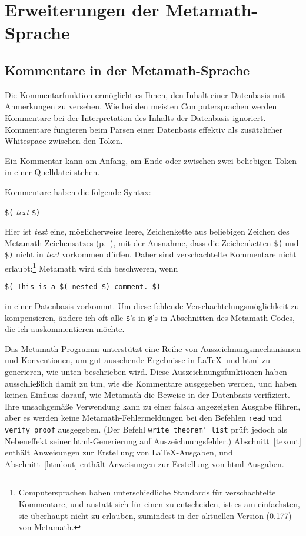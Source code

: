 \section{Erweiterungen der Metamath-Sprache}

\subsection{Kommentare in der Metamath-Sprache}\label{comments}

Die Kommentarfunktion ermöglicht es Ihnen, den Inhalt einer Datenbasis mit Anmerkungen zu versehen.  Wie bei den meisten Computersprachen werden Kommentare bei der Interpretation des Inhalts der Datenbasis ignoriert. Kommentare fungieren beim Parsen einer Datenbasis effektiv als zusätzlicher Whitespace zwischen den Token.

Ein Kommentar kann am Anfang, am Ende oder zwischen zwei beliebigen Token in einer Quelldatei stehen.

Kommentare haben die folgende Syntax:
\begin{center}
 \texttt{\$(} {\em text} \texttt{\$)}
\end{center}
Hier ist  {\em text} eine, möglicherweise leere, Zeichenkette aus beliebigen Zeichen des Metamath-Zeichensatzes (p.~\pageref{spec1chars}), mit der Ausnahme, dass die Zeichenketten \texttt{\$(} und \texttt{\$)} nicht in {\em text} vorkommen dürfen.  Daher sind verschachtelte Kommentare nicht erlaubt:\footnote{Computersprachen haben unterschiedliche Standards für verschachtelte Kommentare, und anstatt sich für einen zu entscheiden, ist es am einfachsten, sie überhaupt nicht zu erlauben, zumindest in der aktuellen Version (0.177) von Metamath.} Metamath wird sich beschweren, wenn
\begin{center}
  \texttt{\$( This is a \$( nested \$) comment.\ \$)}
 \end{center}
 in einer Datenbasis vorkommt. Um diese fehlende Verschachtelungsmöglichkeit zu kompensieren, ändere ich oft alle \texttt{\$}'s in \texttt{@}'s in Abschnitten des Metamath-Codes, die ich auskommentieren möchte.

Das Metamath-Programm unterstützt eine Reihe von Auszeichnungsmechanismen und Konventionen, um gut aussehende Ergebnisse in \LaTeX\ und {\sc html} zu generieren, wie unten beschrieben wird. Diese Auszeichnungsfunktionen haben ausschließlich damit zu tun, wie die Kommentare ausgegeben werden, und haben keinen Einfluss darauf, wie Metamath die Beweise in der Datenbasis verifiziert. Ihre unsachgemäße Verwendung kann zu einer falsch angezeigten Ausgabe führen, aber es werden keine Metamath-Fehlermeldungen bei den Befehlen \texttt{read} und \texttt{verify proof} ausgegeben.  (Der Befehl \texttt{write theorem\texttt{\char`\_}list} prüft jedoch als Nebeneffekt seiner {\sc html}-Generierung auf Auszeichnungsfehler.) Abschnitt~\ref{texout} enthält Anweisungen zur Erstellung von \LaTeX-Ausgaben, und Abschnitt~\ref{htmlout} enthält Anweisungen zur Erstellung von {\sc html}-Ausgaben.

